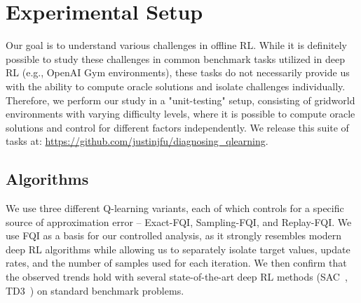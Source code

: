 \section{Experimental Setup}
\label{sec:setup}

Our goal is to understand various challenges in offline RL. While it is definitely possible to study these challenges in common benchmark tasks utilized in deep RL (e.g., OpenAI Gym environments), these tasks do not necessarily provide us with the ability to compute oracle solutions and isolate challenges individually. Therefore, we perform our study in a "unit-testing" setup, consisting of gridworld environments with varying difficulty levels, where it is possible to compute oracle solutions and control for different factors independently. We release this suite of tasks at: \url{https://github.com/justinjfu/diagnosing_qlearning}.    


\iffalse

\subsection{Algorithms}
\label{sec:setup_algos}
We use three different Q-learning variants, each of which controls for a specific source of approximation error -- 
Exact-FQI, Sampling-FQI, and Replay-FQI. 
We use FQI as a basis for our controlled analysis, as it strongly resembles modern deep RL algorithms while allowing us to separately isolate target values, update rates, and the number of samples used for each iteration. We then confirm that the observed trends hold with several state-of-the-art deep RL methods (SAC~\citep{Haarnoja2017}, TD3~\citep{pmlr-v80-fujimoto18a}) on standard benchmark problems.

